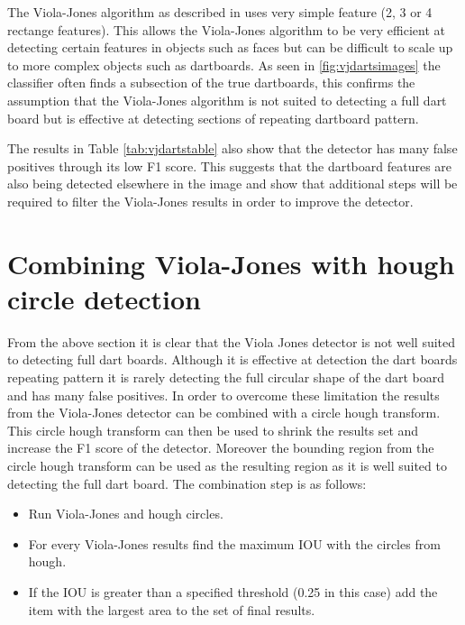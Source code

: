 \documentclass{article}
\begin{document}
\begin{multicols}{2}
The Viola-Jones algorithm as described in \cite{vj} uses very simple feature (2, 3 or 4 rectange features). This allows the Viola-Jones algorithm to be very efficient at detecting certain features in objects such as faces but can be difficult to scale up to more complex objects such as dartboards. As seen in \ref{fig:vjdartsimages} the classifier often finds a subsection of the true dartboards, this confirms the assumption that the Viola-Jones algorithm is not suited to detecting a full dart board but is effective at detecting sections of repeating dartboard pattern. 

The results in Table \ref{tab:vjdartstable} also show that the detector has
many false positives through its low F1 score. This suggests that the dartboard
features are also being detected elsewhere in the image and show that
additional steps will be required to filter the Viola-Jones results in order to
improve the detector.

\section{Combining Viola-Jones with hough circle detection}

From the above section it is clear that the Viola Jones detector is not well
suited to detecting full dart boards. Although it is effective at detection the
dart boards repeating pattern it is rarely detecting the full circular shape of
the dart board and has many false positives. In order to overcome these
limitation the results from the Viola-Jones detector can be combined with a
circle hough transform. This circle hough transform can then be used to shrink
the results set and increase the F1 score of the detector. Moreover the
bounding region from the circle hough transform can be used as the resulting
region as it is well suited to detecting the full dart board. The combination
step is as follows:

\begin{itemize}
  \item Run Viola-Jones and hough circles.
  \item For every Viola-Jones results find the maximum IOU with the circles
    from hough. 
  \item If the IOU is greater than a specified threshold (0.25 in this case)
    add the item with the largest area to the set of final results.
\end{itemize} 


\end{multicols}
\end{document}
